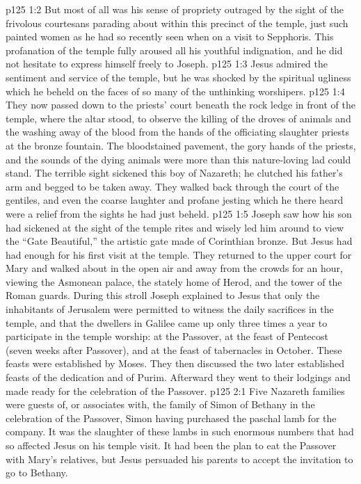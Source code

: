 \vs p125 1:2 But most of all was his sense of propriety outraged by the sight of the frivolous courtesans parading about within this precinct of the temple, just such painted women as he had so recently seen when on a visit to Sepphoris. This profanation of the temple fully aroused all his youthful indignation, and he did not hesitate to express himself freely to Joseph.
\vs p125 1:3 Jesus admired the sentiment and service of the temple, but he was shocked by the spiritual ugliness which he beheld on the faces of so many of the unthinking worshipers.
\vs p125 1:4 They now passed down to the priests’ court beneath the rock ledge in front of the temple, where the altar stood, to observe the killing of the droves of animals and the washing away of the blood from the hands of the officiating slaughter priests at the bronze fountain. The bloodstained pavement, the gory hands of the priests, and the sounds of the dying animals were more than this nature\hyp{}loving lad could stand. The terrible sight sickened this boy of Nazareth; he clutched his father’s arm and begged to be taken away. They walked back through the court of the gentiles, and even the coarse laughter and profane jesting which he there heard were a relief from the sights he had just beheld.
\vs p125 1:5 Joseph saw how his son had sickened at the sight of the temple rites and wisely led him around to view the “Gate Beautiful,” the artistic gate made of Corinthian bronze. But Jesus had had enough for his first visit at the temple. They returned to the upper court for Mary and walked about in the open air and away from the crowds for an hour, viewing the Asmonean palace, the stately home of Herod, and the tower of the Roman guards. During this stroll Joseph explained to Jesus that only the inhabitants of Jerusalem were permitted to witness the daily sacrifices in the temple, and that the dwellers in Galilee came up only three times a year to participate in the temple worship: at the Passover, at the feast of Pentecost (seven weeks after Passover), and at the feast of tabernacles in October. These feasts were established by Moses. They then discussed the two later established feasts of the dedication and of Purim. Afterward they went to their lodgings and made ready for the celebration of the Passover.
\vs p125 2:1 Five Nazareth families were guests of, or associates with, the family of Simon of Bethany in the celebration of the Passover, Simon having purchased the paschal lamb for the company. It was the slaughter of these lambs in such enormous numbers that had so affected Jesus on his temple visit. It had been the plan to eat the Passover with Mary’s relatives, but Jesus persuaded his parents to accept the invitation to go to Bethany.
